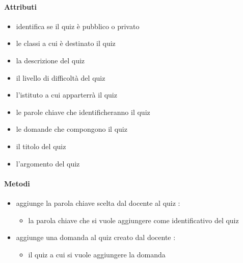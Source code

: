 \paragraph{Attributi}
\begin{itemize}
\item {}
\newline
identifica se il quiz è pubblico o privato
\item {}
\newline
le classi a cui è destinato il quiz
\item {}
\newline
la descrizione del quiz
\item {}
\newline
il livello di difficoltà del quiz
\item {}
\newline
l'istituto a cui apparterrà il quiz
\item {}
\newline
le parole chiave che identificheranno il quiz
\item {}
\newline
le domande che compongono il quiz
\item {}
\newline
il titolo del quiz
\item {}
\newline
l'argomento del quiz
\end{itemize}
\paragraph{Metodi}
\begin{itemize}
\item {}
\newline
aggiunge la parola chiave scelta dal docente al quiz
\newline
{} :
\begin{itemize}
\item {}
\newline
la parola chiave che si vuole aggiungere come identificativo del quiz
\end{itemize}
\item {}
\newline
aggiunge una domanda al quiz creato dal docente
\newline
{} :
\begin{itemize}
\item {}
\newline
il quiz a cui si vuole aggiungere la domanda
\end{itemize}
\end{itemize}
